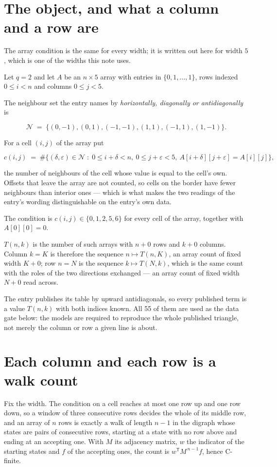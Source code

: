 \documentclass[11pt]{article}
\theoremstyle{definition}
\begin{document}
\section{The object, and what a column and a row are}

The array condition is the same for every width; it is written out here for width $5$, which is one of the widths this note uses.

Let $q = 2$ and let $A$ be an $n \times 5$ array with entries in $\{0,1,\dots,1\}$, rows indexed $0 \le i < n$ and columns $0 \le j < 5$.

The neighbour set the entry names by {\itshape horizontally, diagonally or antidiagonally} is

\[\mathcal{N} \;=\; \{(0,-1), (0,1), (-1,-1), (1,1), (-1,1), (1,-1)\}.\]

For a cell $(i,j)$ of the array put

\[c(i,j) \;=\; \#\bigl\{(\delta,\varepsilon)\in\mathcal{N} \;:\; 0\le i+\delta<n,\ 0\le j+\varepsilon<5,\ A[i+\delta][j+\varepsilon] = A[i][j]\bigr\},\]

the number of neighbours of the cell whose value is equal to the cell's own. Offsets that leave the array are not counted, so cells on the border have fewer neighbours than interior ones --- which is what makes the two readings of the entry's wording distinguishable on the entry's own data.

The condition is $c(i,j) \in \{0, 1, 2, 5, 6\}$ for every cell of the array, together with $A[0][0]=0$.

$T(n,k)$ is the number of such arrays with $n + 0$ rows and $k + 0$ columns. Column $k = K$ is therefore the sequence $n \mapsto T(n,K)$, an array count of fixed width $K + 0$; row $n = N$ is the sequence $k \mapsto T(N,k)$, which is the same count with the roles of the two directions exchanged --- an array count of fixed width $N + 0$ read across.

The entry publishes its table by upward antidiagonals, so every published term is a value $T(n,k)$ with both indices known. All 55 of them are used as the data gate below: the models are required to reproduce the whole published triangle, not merely the column or row a given line is about.

\section{Each column and each row is a walk count}

Fix the width. The condition on a cell reaches at most one row up and one row down, so a window of three consecutive rows decides the whole of its middle row, and an array of $n$ rows is exactly a walk of length $n-1$ in the digraph whose states are pairs of consecutive rows, starting at a state with no row above and ending at an accepting one. With $M$ its adjacency matrix, $w$ the indicator of the starting states and $f$ of the accepting ones, the count is $w^{\mathsf T}M^{\,n-1}f$, hence C-finite.
\end{document}
